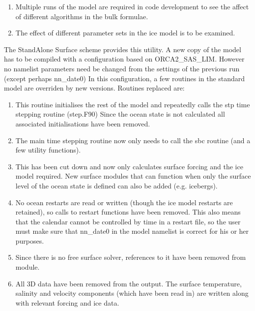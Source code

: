 \begin{enumerate}
\item  Multiple runs of the model are required in code development to see the affect of different algorithms in
       the bulk formulae.
\item  The effect of different parameter sets in the ice model is to be examined.
\end{enumerate}

The StandAlone Surface scheme provides this utility.
A new copy of the model has to be compiled with a configuration based on ORCA2\_SAS\_LIM.
However no namelist parameters need be changed from the settings of the previous run (except perhaps nn{\_}date0)
In this configuration, a few routines in the standard model are overriden by new versions.
Routines replaced are:

\begin{enumerate}
\item  {}

       This routine initialises the rest of the model and repeatedly calls the stp time stepping routine (step.F90)
       Since the ocean state is not calculated all associated initialisations have been removed.
\item  {}

       The main time stepping routine now only needs to call the sbc routine (and a few utility functions).
\item  {}

       This has been cut down and now only calculates surface forcing and the ice model required.  New surface modules
       that can function when only the surface level of the ocean state is defined can also be added (e.g. icebergs).
\item  {}

       No ocean restarts are read or written (though the ice model restarts are retained), so calls to restart functions
       have been removed.  This also means that the calendar cannot be controlled by time in a restart file, so the user
       must make sure that nn{\_}date0 in the model namelist is correct for his or her purposes.
\item  {}

       Since there is no free surface solver, references to it have been removed from  module.
\item  {}

       All 3D data have been removed from the output.  The surface temperature, salinity and velocity components (which
       have been read in) are written along with relevant forcing and ice data.
\end{enumerate}

